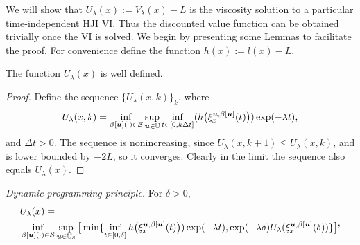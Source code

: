 %

\begin{for_journal}

We will show that $U_{\lambda}(x):= V_{\lambda}(x) - L$ is the viscosity solution to a particular time-independent HJI VI. Thus the discounted value function can be obtained trivially once the VI is solved. We begin by presenting some Lemmas to facilitate the proof. For convenience define the function $h(x):=l(x)-L$.

\begin{lemma}
The function $U_\lambda(x)$ is well defined. 
\end{lemma} 

\begin{proof}
Define the sequence $\{U_\lambda(x,k)\}_k$, where
\begin{equation}
U_\lambda(x,k) = \inf_{\beta[\bm{u}](\cdot) \in \mathcal{B}} \sup_{\bm{u} \in \mathbb{U}} \inf_{t \in [0,k\Delta t]}(h\big(\xi_{x}^{\bm{u},\beta[\bm{u}]}(t)\big))\exp(-\lambda  t),
\end{equation}
\noindent and $\Delta t>0$. The sequence is nonincreasing, since $U_\lambda(x,k+1) \leq U_\lambda(x,k)$, and is lower bounded by $-2L$, so it converges. Clearly in the limit the sequence also equals $U_{\lambda}(x)$.
\end{proof}



\begin{lemma} \label{dpp}
\emph{Dynamic programming principle.} For $\delta>0$,
\begin{equation} 
\begin{split}
&U_{\lambda}(x) =\\ 
&\inf_{\beta[\bm{u}](\cdot) \in \mathcal{B}} \sup_{\bm{u} \in \mathbb{U}_\delta} 
\big [\min\{\inf_{t \in [0, \delta]} h\big(\xi_{x}^{\bm{u},\beta[\bm{u}]}(t)\big))\exp(-\lambda  t), \exp(-\lambda \delta)U_{\lambda}(\xi_{x}^{\bm{u},\beta[\bm{u}]}(\delta))\}
\big ]
\end{split},
\end{equation}


\end{lemma}
\end{for_journal}
